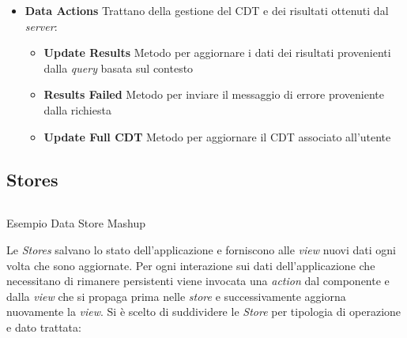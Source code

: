 \begin{itemize}
	\item \textbf{Data Actions}
	Trattano della gestione del CDT e dei risultati ottenuti dal \emph{server}:
	\begin{itemize}
		\item \textbf{Update Results}
		Metodo per aggiornare i dati dei risultati provenienti dalla \emph{query} basata sul contesto
		\item \textbf{Results Failed}
		Metodo per inviare il messaggio di errore proveniente dalla richiesta
		\item \textbf{Update Full CDT}
		Metodo per aggiornare il CDT associato all'utente
	\end{itemize}
\end{itemize}

\subsection{Stores\label{sec:stores}}

\begin{listing}[p]
	\inputminted{json}{4-progettazione-alto-livello/Codice/store-two-topics.json}
	\caption{Esempio Data Store Mashup}
	\label{lst:store-two-topics}
\end{listing}

Le \emph{Stores} salvano lo stato dell'applicazione e forniscono alle \emph{view} nuovi dati ogni volta che sono aggiornate. 
Per ogni interazione sui dati dell'ap\-pli\-ca\-zio\-ne che necessitano di rimanere persistenti viene invocata una \emph{action} dal componente e dalla \emph{view} che si propaga prima nelle \emph{store} e successivamente aggiorna nuovamente la \emph{view}.
Si è scelto di suddividere le \emph{Store} per tipologia di operazione e dato trattata:

